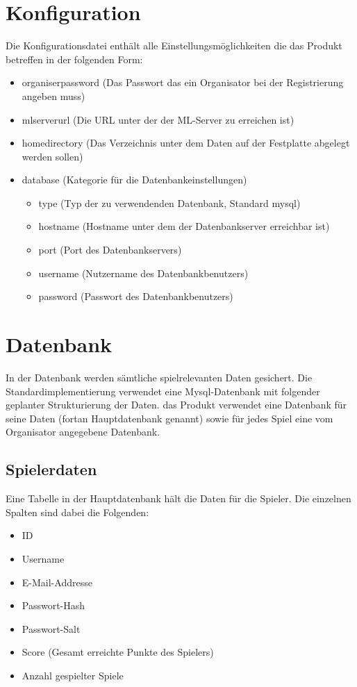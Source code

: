 \documentclass[a4paper]{scrreprt}
\begin{document}
	\section{Konfiguration}
	Die Konfigurationsdatei enthält alle Einstellungsmöglichkeiten die das Produkt betreffen in der folgenden Form:
	\begin{itemize}
		\item organiserpassword (Das Passwort das ein Organisator bei der Registrierung angeben muss)
		\item mlserverurl       (Die URL unter der der ML-Server zu erreichen ist)
		\item homedirectory     (Das Verzeichnis unter dem Daten auf der Festplatte abgelegt werden sollen)
		\item database          (Kategorie für die Datenbankeinstellungen)
		\begin{itemize}
			\item type          (Typ der zu verwendenden Datenbank, Standard mysql)
			\item hostname      (Hostname unter dem der Datenbankserver erreichbar ist)
			\item port          (Port des Datenbankservers)
			\item username      (Nutzername des Datenbankbenutzers)
			\item password      (Passwort des Datenbankbenutzers)
		\end{itemize}
	\end{itemize}
	\section{Datenbank}
	In der Datenbank werden sämtliche spielrelevanten Daten gesichert.
	Die Standardimplementierung verwendet eine Mysql-Datenbank mit folgender geplanter Strukturierung der Daten.
	das Produkt verwendet eine Datenbank für seine Daten (fortan Hauptdatenbank genannt) sowie für jedes Spiel eine vom Organisator angegebene Datenbank.
	\subsection{Spielerdaten}
	Eine Tabelle in der Hauptdatenbank hält die Daten für die Spieler.
	Die einzelnen Spalten sind dabei die Folgenden:
	\begin{itemize}
		\item ID
		\item Username
		\item E-Mail-Addresse
		\item Passwort-Hash
		\item Passwort-Salt
		\item Score (Gesamt erreichte Punkte des Spielers)
		\item Anzahl gespielter Spiele
	\end{itemize}
\end{document}
